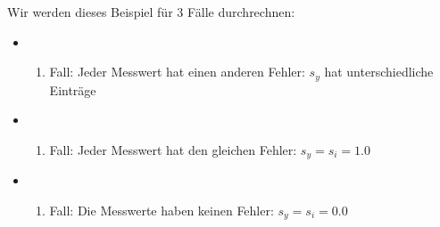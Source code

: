 \documentclass[letterpaper,10pt,english]{jupyterBook}
\begin{document}
\sphinxAtStartPar
Wir werden dieses Beispiel für 3 Fälle durchrechnen:
\begin{itemize}
\item {} \begin{enumerate}
%
\item {} 
\sphinxAtStartPar
Fall: Jeder Messwert hat einen anderen Fehler: \(s_y\) hat unterschiedliche Einträge

\end{enumerate}

\item {} \begin{enumerate}
%
\item {} 
\sphinxAtStartPar
Fall: Jeder Messwert hat den gleichen Fehler: \(s_y = s_i = 1.0\)

\end{enumerate}

\item {} \begin{enumerate}
%
\item {} 
\sphinxAtStartPar
Fall: Die Messwerte haben keinen Fehler: \(s_y = s_i = 0.0\)

\end{enumerate}

\end{itemize}
\end{document}
